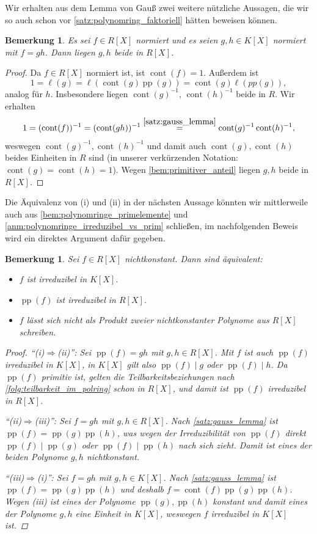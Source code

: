 \documentclass[a4paper, twoside, 11pt, ngerman]{report}
\DeclareMathOperator{\cont}{cont}
\DeclareMathOperator{\pp}{pp}
\theoremstyle{definistyle}
\newtheorem{bem}[satz]{Bemerkung}
\theoremstyle{remark}
\begin{document}
Wir erhalten aus dem Lemma von Gauß zwei weitere nützliche Aussagen, die wir so  
auch schon vor \ref{satz:polynomring_faktoriell} hätten beweisen können. 

\begin{bem}
Es sei $f\in R[X]$ normiert und es seien $g,h\in K[X]$ normiert mit $f=gh$.
Dann liegen $g,h$ beide in $R[X]$.
\end{bem}
\begin{proof}
Da $f\in R[X]$ normiert ist, ist $\cont(f)=1$. Außerdem ist
\[
1=\ell(g)=\ell(\cont(g)\pp(g))=\cont(g)\ell(pp(g)),
\]
analog für $h$. Insbesondere liegen $\cont(g)^{-1}$, $\cont(h)^{-1}$ beide in $R$. Wir erhalten
\[
1=(\cont(f))^{-1}=(\cont(gh))^{-1}\overset{\ref{satz:gauss_lemma}}{=}\cont(g)^{-1}\cont(h)^{-1},
\]
weswegen $\cont(g)^{-1},\cont(h)^{-1}$ und damit auch $\cont(g),\cont(h)$ beides Einheiten in $R$ sind (in unserer verkürzenden Notation: $\cont(g)=\cont(h)=1$). Wegen \ref{bem:primitiver_anteil} liegen $g,h$ beide in $R[X]$.
\end{proof}

Die Äquivalenz von (i) und (ii) in der nächsten Aussage könnten wir mittlerweile auch aus \ref{bem:polynomringe_primelemente} und \ref{anm:polynomringe_irreduzibel_vs_prim}
schließen, im nachfolgenden Beweis wird ein direktes Argument dafür gegeben.

\begin{bem}\label{bem:irreduzibilitaet_polynomringe}
Sei $f \in R[X]$ nichtkonstant. Dann sind äquivalent:
\begin{itemize}
    \item[(i)] $f$ ist irreduzibel in $K[X]$.
    \item[(ii)] $\pp(f)$ ist irreduzibel in $R[X]$.
    \item[(iii)] $f$ lässt sich nicht als Produkt zweier nichtkonstanter Polynome aus $R[X]$ schreiben.
\end{itemize}
\begin{proof}
"`(i)$\Rightarrow$(ii)"': Sei $\pp(f)=gh$ mit $g,h\in R[X]$. Mit $f$ ist auch $\pp(f)$ irreduzibel in $K[X]$, in $K[X]$ gilt also $\pp(f)\mid g$ oder $\pp(f)\mid h$.
Da $\pp(f)$ primitiv ist, gelten die Teilbarkeitsbeziehungen nach \ref{folg:teilbarkeit_im_polring} schon in $R[X]$,
und damit ist $\pp(f)$ irreduzibel in $R[X]$.

"`(ii)$\Rightarrow$(iii)"': Sei $f=gh$ mit $g,h\in R[X]$. Nach \ref{satz:gauss_lemma} ist
$\pp(f)=\pp(g)\pp(h)$, was wegen der Irreduzibilität von $\pp(f)$ direkt $\pp(f)\mid\pp(g)$ oder $\pp(f)\mid \pp(h)$ nach sich zieht. Damit ist eines der beiden Polynome $g,h$ nichtkonstant.

"`(iii)$\Rightarrow$(i)"': Sei $f=gh$ mit $g,h\in K[X]$. Nach \ref{satz:gauss_lemma} ist
$\pp(f)=\pp(g)\pp(h)$ und deshalb $f=\cont(f)\pp(g)\pp(h)$. Wegen (iii) ist eines der Polynome $\pp(g),\pp(h)$ konstant und damit eines der Polynome $g,h$ eine Einheit in $K[X]$,
weswegen $f$ irreduzibel in $K[X]$ ist. 
\end{proof}
\end{bem}
\end{document}
